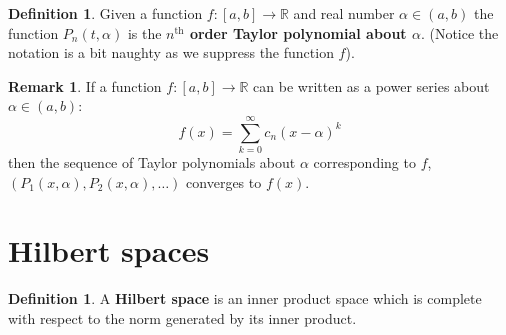 \documentclass[12pt]{article}
\theoremstyle{plain}
\theoremstyle{definition}
\newtheorem{defn}[thm]{Definition} %
\newtheorem{remark}[thm]{Remark}
\newcommand{\bb}[1]{\mathbb{#1}}
\newcommand{\lto}{\longrightarrow}
\begin{document}
\begin{defn}
Given a function $f: [a,b] \lto \bb{R}$ and real number $\alpha \in (a,b)$ the function $P_n(t,\alpha)$ is the \textbf{$n^{\operatorname{th}}$ order Taylor polynomial about $\alpha$}. (Notice the notation is a bit naughty as we suppress the function $f$). 
\end{defn}
\begin{remark}
If a function $f: [a,b] \lto \bb{R}$ can be written as a power series about $\alpha \in (a,b)$:
\[f(x) = \sum_{k = 0}^\infty c_n(x - \alpha)^k\]
then the sequence of Taylor polynomials about $\alpha$ corresponding to $f$, $(P_1(x,\alpha),P_2(x,\alpha),\hdots)$ converges to $f(x)$.
\end{remark}

\section{Hilbert spaces}
\begin{defn}
A \textbf{Hilbert space} is an inner product space which is complete with respect to the norm generated by its inner product.
\end{defn}
\end{document}
